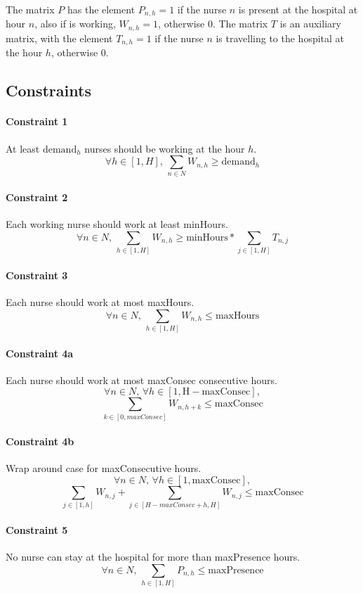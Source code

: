 \documentclass[12pt,a4paper]{article}
\begin{document}
\noindent
The matrix $P$ has the element $P_{n,h} = 1$ if the nurse $n$ is present at the hospital
at hour $n$, also if is working, $W_{n,h} = 1$, otherwise 0.
%
The matrix $T$ is an auxiliary matrix, with the element $T_{n,h} = 1$ if the
nurse $n$ is travelling to the hospital at the hour $h$, otherwise 0.

\subsection{Constraints}

\paragraph{Constraint 1} At least $\textrm{demand}_h$ nurses should be working
at the hour $h$.
$$ \forall h\in [1, H],\, \sum_{n \in N} W_{n,h} \ge \textrm{demand}_h$$
%
\paragraph{Constraint 2} Each working nurse should work at least minHours.
$$ \forall n \in N,\, \sum_{h \in [1, H]} W_{n,h} \ge
  \textrm{minHours} * \sum_{j \in [1, H]} T_{n,j} $$
%
\paragraph{Constraint 3} Each nurse should work at most maxHours.
$$ \forall n \in N,\, \sum_{h \in [1, H]} W_{n,h} \le \textrm{maxHours} $$
%
\paragraph{Constraint 4a} Each nurse should work at most maxConsec consecutive
hours.
$$ \forall n \in N,\, \forall h \in [1, \textrm{H} - \textrm{maxConsec}],$$
$$\sum_{k \in [0, maxConsec]} W_{n, h+k} \le \textrm{maxConsec}
$$
%
\paragraph{Constraint 4b} Wrap around case for maxConsecutive hours.
$$ \forall n \in N,\, \forall h \in [1, \textrm{maxConsec}],$$
$$\sum_{j \in [1, h]} W_{n, j} +
  \sum_{j \in [H-maxConsec+h, H]} W_{n, j}  \le \textrm{maxConsec}
$$
%
\paragraph{Constraint 5} No nurse can stay at the hospital for more than
maxPresence hours.
$$ \forall n \in N, \, \sum_{h \in [1, H]} P_{n,h} \le \textrm{maxPresence} $$
%
\end{document}
